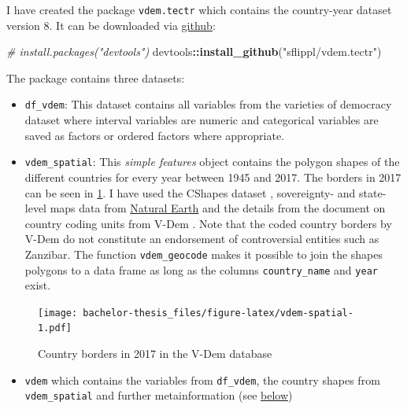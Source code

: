 \documentclass[]{report}
\newenvironment{Shaded}{\begin{snugshade}}{\end{snugshade}}
\newcommand{\KeywordTok}[1]{\textcolor[rgb]{0.13,0.29,0.53}{\textbf{#1}}}
\newcommand{\StringTok}[1]{\textcolor[rgb]{0.31,0.60,0.02}{#1}}
\newcommand{\CommentTok}[1]{\textcolor[rgb]{0.56,0.35,0.01}{\textit{#1}}}
\newcommand{\OperatorTok}[1]{\textcolor[rgb]{0.81,0.36,0.00}{\textbf{#1}}}
\newcommand{\NormalTok}[1]{#1}
\providecommand{\tightlist}{%
  \setlength{\itemsep}{0pt}\setlength{\parskip}{0pt}}
\theoremstyle{definition}
\theoremstyle{definition}
\theoremstyle{definition}
\theoremstyle{remark}
\begin{document}
I have created the package \texttt{vdem.tectr} which contains the
country-year dataset version 8. It can be downloaded via
\href{github.com/sflippl/vdem.tectr}{github}:

\begin{Shaded}
\begin{Highlighting}[]
\CommentTok{# install.packages("devtools")}
\NormalTok{devtools}\OperatorTok{::}\KeywordTok{install_github}\NormalTok{(}\StringTok{"sflippl/vdem.tectr"}\NormalTok{)}
\end{Highlighting}
\end{Shaded}

The package contains three datasets:

\begin{itemize}
\tightlist
\item
  \texttt{df\_vdem}: This dataset contains all variables from the
  varieties of democracy dataset where interval variables are numeric
  and categorical variables are saved as factors or ordered factors
  where appropriate.
\item
  \texttt{vdem\_spatial}: This \emph{simple features} object \citep{sf}
  contains the polygon shapes of the different countries for every year
  between 1945 and 2017. The borders in 2017 can be seen in
  \ref{fig:vdem-spatial}. I have used the CShapes dataset
  \citep[\citet{Weidmann2010a}]{Weidmann2010}, sovereignty- and
  state-level maps data from \href{www.naturalearthdata.com}{Natural
  Earth} and the details from the document on country coding units from
  V-Dem \citep{Coppedge2018}. Note that the coded country borders by
  V-Dem do not constitute an endorsement of controversial entities such
  as Zanzibar. The function \texttt{vdem\_geocode} makes it possible to
  join the shapes polygons to a data frame as long as the columns
  \texttt{country\_name} and \texttt{year} exist.
\end{itemize}

\begin{figure}
\centering
\texttt{[image: bachelor-thesis\_files/figure-latex/vdem-spatial-1.pdf]}
\caption{\label{fig:vdem-spatial}Country borders in 2017 in the V-Dem
database}
\end{figure}

\begin{itemize}
\tightlist
\item
  \texttt{vdem} which contains the variables from \texttt{df\_vdem}, the
  country shapes from \texttt{vdem\_spatial} and further metainformation
  (see \protect\hyperlink{application}{below})
\end{itemize}
\end{document}

